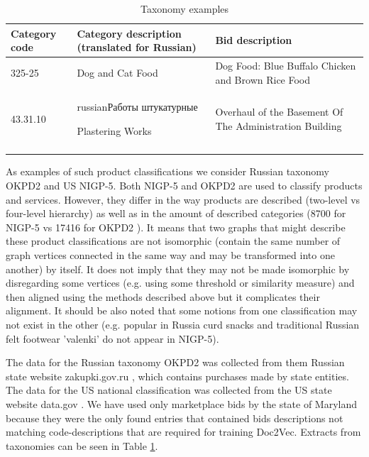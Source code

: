 \documentclass[11pt,a4paper]{article}
\begin{document}
\begin{center}
	\begin{table}[!htbp]
		\caption{Taxonomy examples}
		\begin{tabular}{p{1.5cm}|p{3cm}|p{3cm}}
			Category code & Category description \newline (translated for Russian) & Bid description\\
			\hline
			\hline
			325-25 & Dog and Cat Food & Dog Food: Blue Buffalo Chicken and Brown Rice Food\\
			43.31.10 & \begin{otherlanguage*}{russian}Работы штукатурные\end{otherlanguage*} \newline Plastering Works & Overhaul of the Basement Of The Administration Building\\
			\label{table-taxonomies}
		\end{tabular}
	\end{table}
\end{center}

As examples of such product classifications we consider Russian taxonomy OKPD2 and US NIGP-5.
Both NIGP-5 and OKPD2 are used to classify products and services. However, they differ in the way products are described (two-level vs four-level hierarchy) as well as in the amount of described categories (8700 for NIGP-5 \cite{wiki-nigp} vs 17416 for OKPD2 \cite{wiki-okpd}). It means that two graphs that might describe these product classifications are not isomorphic (contain the same number of graph vertices connected in the same way and may be transformed into one another) by itself.  It does not imply that they may not be made isomorphic by disregarding some vertices (e.g. using some threshold or similarity measure) and then aligned using the methods described above but it complicates their alignment. It should be also noted that some notions from one classification may not exist in the other (e.g. popular in Russia curd snacks and traditional Russian felt footwear 'valenki' do not appear in NIGP-5).

The data for the Russian taxonomy OKPD2 was collected from them Russian state website zakupki.gov.ru \cite{gos-zakupki}, which contains purchases made by state entities.
The data for the US national classification was collected from the US state website data.gov \cite{data-gov}. We have used only marketplace bids by the state of Maryland because they were the only found entries that contained bids descriptions not matching code-descriptions that are required for training Doc2Vec. Extracts from taxonomies can be seen in Table \ref{table-taxonomies}.
\end{document}
